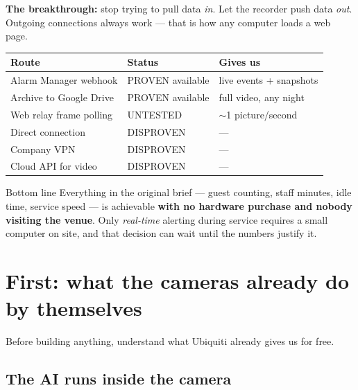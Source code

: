 \documentclass[11pt,a4paper]{article}
\begin{document}
\textbf{The breakthrough:} stop trying to pull data \emph{in}. Let the
recorder push data \emph{out}. Outgoing connections always work --- that is
how any computer loads a web page.

\begin{center}
\begin{tabular}{@{}p{5.4cm}ll@{}}
\toprule
\textbf{Route} & \textbf{Status} & \textbf{Gives us} \\
\midrule
Alarm Manager webhook   & \textcolor{ok}{PROVEN available}  & live events + snapshots \\
Archive to Google Drive & \textcolor{ok}{PROVEN available}  & full video, any night \\
Web relay frame polling & \textcolor{warn}{UNTESTED}        & $\sim$1 picture/second \\
Direct connection       & \textcolor{bad}{DISPROVEN}        & --- \\
Company VPN             & \textcolor{bad}{DISPROVEN}        & --- \\
Cloud API for video     & \textcolor{bad}{DISPROVEN}        & --- \\
\bottomrule
\end{tabular}
\end{center}

\begin{good}{Bottom line}
Everything in the original brief --- guest counting, staff minutes, idle
time, service speed --- is achievable \textbf{with no hardware purchase and
nobody visiting the venue}. Only \emph{real-time} alerting during service
requires a small computer on site, and that decision can wait until the
numbers justify it.
\end{good}

\section{First: what the cameras already do by themselves}

Before building anything, understand what Ubiquiti already gives us for free.

\subsection{The AI runs inside the camera}
\end{document}
